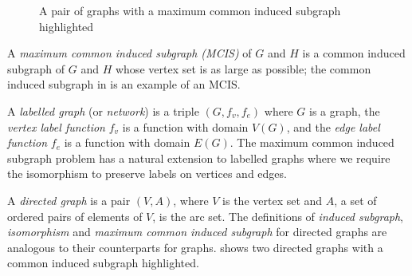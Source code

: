 \begin{figure}[h!]
\centering
{}
\qquad
{}
\caption{A pair of graphs with a maximum common induced subgraph highlighted}
\label{fig:cis-example}
\end{figure}

A \emph{maximum common induced subgraph (MCIS)} of $G$ and $H$ is a common
induced subgraph of $G$ and $H$ whose vertex set is as large as possible; the
common induced subgraph in  is an example of an MCIS.

A \emph{labelled graph} (or \emph{network}) is a triple $(G, f_v, f_e)$
where $G$ is a graph,
the \emph{vertex label function} $f_v$ is a function with domain $V(G)$,
and the \emph{edge label function} $f_e$ is a function with domain $E(G)$.
The maximum common induced subgraph problem has a natural extension to labelled graphs
where we require the isomorphism to preserve labels on vertices and edges.

A \emph{directed graph} is a pair $(V,A)$, where $V$ is the vertex set and $A$,
a set of ordered pairs of elements of $V$, is the arc set.  The definitions of
\emph{induced subgraph}, \emph{isomorphism} and \emph{maximum common induced
subgraph} for directed graphs are analogous to their counterparts for graphs.
\label{fig:directed-cis-example} shows two directed graphs with a common
induced subgraph highlighted.

